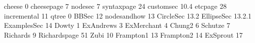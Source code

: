 \fdef cheese {0}
\fdef cheesepage {7}
\fdef nodesec {7}
\fdef syntaxpage {24}
\fdef customsec {10.4}
\fdef etcpage {28}
\fdef incremental {11}
\fdef qtree {0}
\fdef BBSec {12}
\fdef nodesandhow {13}
\fdef CircleSec {13.2}
\fdef EllipseSec {13.2.1}
\fdef ExamplesSec {14}
\fdef Dowty {1}
\fdef ExAndrews {3}
\fdef ExMerchant {4}
\fdef Chung2 {6}
\fdef Schutze {7}
\fdef Richards {9}
\fdef Richardspage {51}
\fdef Zubi {10}
\fdef Frampton1 {13}
\fdef Frampton2 {14}
\fdef ExSprout {17}
